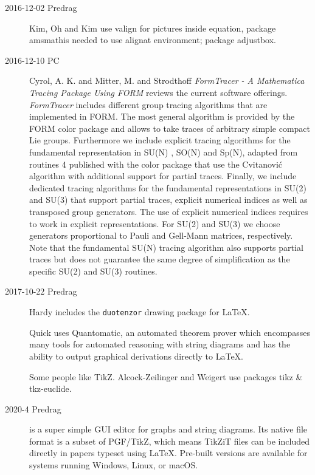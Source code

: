 \begin{description}

\item[2016-12-02 Predrag]
Kim, Oh and Kim use valign for pictures inside equation,
package {amsmath}is needed to use alignat environment;
package {adjustbox}.

\item[2016-12-10 PC]
Cyrol, A. K. and Mitter, M. and Strodthoff
{\em {FormTracer - A Mathematica Tracing Package Using FORM}}
reviews the current software offerings.
\emph{FormTracer} includes different group tracing algorithms that are
implemented in FORM. The most general algorithm is
provided by the FORM color package and allows to take traces of
arbitrary simple compact Lie groups. Furthermore we include explicit tracing
algorithms for the fundamental representation in SU(N) , SO(N) and Sp(N),
adapted from routines 4 published with the color package that
use the Cvitanovi{\'c} algorithm with additional support for partial
traces. Finally, we include dedicated tracing algorithms for the fundamental
representations in SU(2) and SU(3) that support partial traces, explicit
numerical indices as well as transposed group generators. The use of explicit
numerical indices requires to work in explicit representations.  For SU(2)
and SU(3) we choose generators proportional to Pauli and Gell-Mann matrices,
respectively. Note that the fundamental SU(N) tracing algorithm also supports
partial traces but does not guarantee the same degree of simplification as
the specific SU(2) and SU(3) routines.

\item[2017-10-22 Predrag]
Hardy  includes the \texttt{duotenzor} drawing package for LaTeX.

Quick  uses 
{Quantomatic}, an automated theorem prover which  encompasses many tools for
automated reasoning with string diagrams and has the ability to output
graphical derivations directly to LaTeX.

Some people like  {TikZ}.
Alcock-Zeilinger and Weigert use packages {tikz} \& {tkz-euclide}.

\item[2020-4 Predrag]
 is a super simple GUI editor for
graphs and string diagrams. Its native file format is a subset of
PGF/TikZ, which means TikZiT files can be included directly in papers
typeset using LaTeX. Pre-built versions are available for systems running
Windows, Linux, or macOS.

\end{description}

